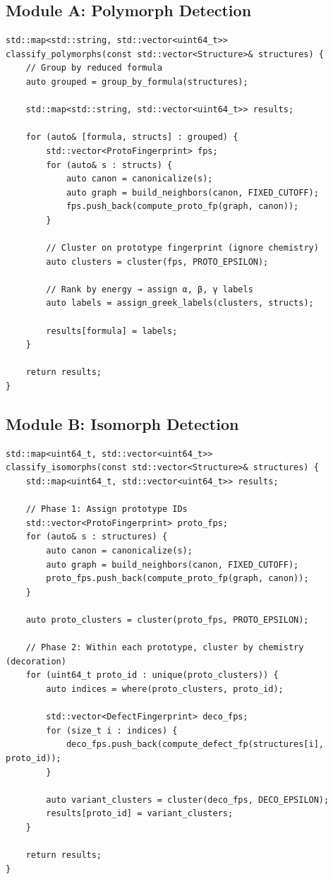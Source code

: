 \documentclass[11pt]{article}
\begin{document}
\subsection{Module A: Polymorph Detection}

\begin{lstlisting}[caption={Polymorph Classifier (Same Chemistry $\to$ Structure Phases)}]
std::map<std::string, std::vector<uint64_t>>
classify_polymorphs(const std::vector<Structure>& structures) {
    // Group by reduced formula
    auto grouped = group_by_formula(structures);
    
    std::map<std::string, std::vector<uint64_t>> results;
    
    for (auto& [formula, structs] : grouped) {
        std::vector<ProtoFingerprint> fps;
        for (auto& s : structs) {
            auto canon = canonicalize(s);
            auto graph = build_neighbors(canon, FIXED_CUTOFF);
            fps.push_back(compute_proto_fp(graph, canon));
        }
        
        // Cluster on prototype fingerprint (ignore chemistry)
        auto clusters = cluster(fps, PROTO_EPSILON);
        
        // Rank by energy → assign α, β, γ labels
        auto labels = assign_greek_labels(clusters, structs);
        
        results[formula] = labels;
    }
    
    return results;
}
\end{lstlisting}

\subsection{Module B: Isomorph Detection}

\begin{lstlisting}[caption={Isomorph Classifier (Same Structure $\to$ Chemistry Variants)}]
std::map<uint64_t, std::vector<uint64_t>>
classify_isomorphs(const std::vector<Structure>& structures) {
    std::map<uint64_t, std::vector<uint64_t>> results;
    
    // Phase 1: Assign prototype IDs
    std::vector<ProtoFingerprint> proto_fps;
    for (auto& s : structures) {
        auto canon = canonicalize(s);
        auto graph = build_neighbors(canon, FIXED_CUTOFF);
        proto_fps.push_back(compute_proto_fp(graph, canon));
    }
    
    auto proto_clusters = cluster(proto_fps, PROTO_EPSILON);
    
    // Phase 2: Within each prototype, cluster by chemistry (decoration)
    for (uint64_t proto_id : unique(proto_clusters)) {
        auto indices = where(proto_clusters, proto_id);
        
        std::vector<DefectFingerprint> deco_fps;
        for (size_t i : indices) {
            deco_fps.push_back(compute_defect_fp(structures[i], proto_id));
        }
        
        auto variant_clusters = cluster(deco_fps, DECO_EPSILON);
        results[proto_id] = variant_clusters;
    }
    
    return results;
}
\end{lstlisting}
\end{document}
